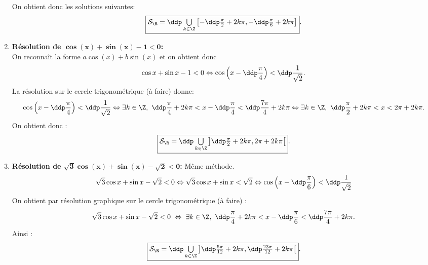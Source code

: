 \begin{correction}
\begin{enumerate}
On obtient donc les solutions suivantes:
$$\fbox{$\mathcal{S}_{\R}=\ddp \mathop{\bigcup}\limits_{k\in \Z} \left[  -\ddp\frac{\pi}{2}+2k\pi, -\ddp\frac{\pi}{6}+2k\pi \right]$}.$$
\item \textbf{R\'esolution de $\mathbf{\cos{(x)}+\sin{(x)}-1<0   }$:}\\
\noindent On reconna\^{i}t la forme $a\cos{(x)}+b\sin{(x)}$ et on obtient donc
$$\cos{x}+\sin{x}-1<0 \Leftrightarrow \cos{\left( x-\ddp\frac{\pi}{4} \right)}<\ddp\frac{1}{\sqrt{2}}.$$
La r\'esolution sur le cercle trigonom\'etrique (\`a faire) donne: 
$$\cos{\left( x-\ddp\frac{\pi}{4} \right)}<\ddp\frac{1}{\sqrt{2}} \Leftrightarrow \exists k\in\Z,\ \ddp\frac{\pi}{4}+2k\pi <  x-\ddp\frac{\pi}{4} <\ddp\frac{7\pi}{4}+2k\pi \Leftrightarrow \exists k\in\Z,\ \ddp\frac{\pi}{2}+2k\pi <  x <2\pi+2k\pi .$$
On obtient donc :
$$\fbox{$\mathcal{S}_{\R}=\ddp \mathop{\bigcup}\limits_{k\in \Z} \left]  \ddp\frac{\pi}{2}+2k\pi , 2\pi+2k\pi\right[$}.$$
\item \textbf{R\'esolution de $\mathbf{ \sqrt{3}\cos{(x)}+\sin{(x)}-\sqrt{2}<0  }$:} M\^{e}me m\'ethode.
$$\sqrt{3}\cos{x}+\sin{x}-\sqrt{2}<0 \Leftrightarrow \sqrt{3}\cos{x}+\sin{x}<\sqrt{2} \Leftrightarrow \cos{\left( x-\ddp\frac{\pi}{6} \right)}<\ddp\frac{1}{\sqrt{2}} $$
On obtient par r\'esolution graphique sur le cercle trigonom\'etrique (\`a faire) :
$$\sqrt{3}\cos{x}+\sin{x}-\sqrt{2}<0 \; \Leftrightarrow  \; \exists k\in\Z,\ \ddp\frac{\pi}{4}+2k\pi <  x-\ddp\frac{\pi}{6} <\ddp\frac{7\pi}{4}+2k\pi.$$ 
Ainsi :
$$\fbox{$\mathcal{S}_{\R}=\ddp \mathop{\bigcup}\limits_{k\in \Z} \left]    \ddp\frac{5\pi}{12}+2k\pi , \ddp\frac{23\pi}{12}+2k\pi\right[$}.$$
\end{enumerate}
\end{correction}
